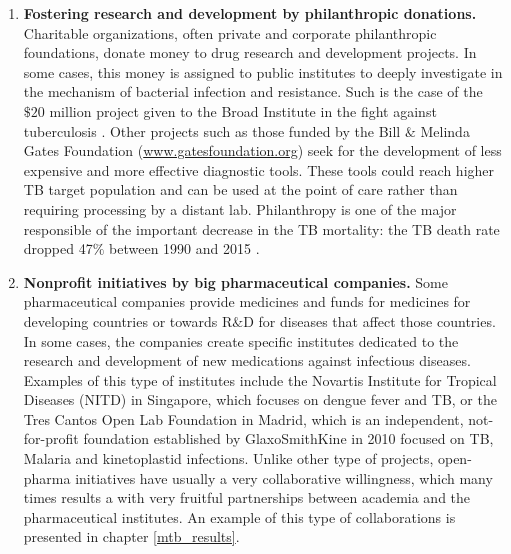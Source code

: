 \documentclass[11pt, b5paper,twoside]{tesi_upf}
\begin{document}
\begin{enumerate}

\item \textbf{Fostering research and development by philanthropic donations.} Charitable organizations, often private and corporate philanthropic foundations, donate money to drug research and development projects. In some cases, this money is assigned to public institutes to deeply investigate in the mechanism of bacterial infection and resistance. Such is the case of the $\$20$ million  project given to the Broad Institute in the fight against tuberculosis \cite{BroadInstitute}. Other projects such as those funded by the Bill $\&$ Melinda Gates Foundation (\url{www.gatesfoundation.org}) seek for the development of less expensive and more effective diagnostic tools. These tools could reach higher TB target population and can be used at the point of care rather than requiring processing by a distant lab. Philanthropy is one of the major responsible of the important decrease in the TB mortality: the TB death rate dropped 47$\%$ between 1990 and 2015 \cite{Lewandowski2015}. 

\item \textbf{Nonprofit initiatives by big pharmaceutical companies.} Some pharmaceutical companies provide medicines and funds for medicines for developing countries or towards R$\&$D for diseases that affect those countries. In some cases, the companies create specific institutes dedicated to the research and development of new medications against infectious diseases. Examples of this type of institutes include the Novartis Institute for Tropical Diseases (NITD) in Singapore, which focuses on dengue fever and TB, or the Tres Cantos Open Lab Foundation in Madrid, which is an independent, not-for-profit foundation established by GlaxoSmithKine in 2010 focused on TB, Malaria and kinetoplastid infections. Unlike other type of projects, open-pharma initiatives have usually a very collaborative willingness, which many times results a with very fruitful partnerships between academia and the pharmaceutical institutes. An example of this type of collaborations is presented in chapter \ref{mtb_results}.


\end{enumerate}
\end{document}
